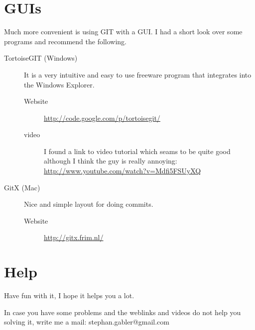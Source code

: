 \documentclass[]{article}
\begin{document}
\section{GUIs} %
\label{sg:sec:guis}

Much more convenient is using GIT with a GUI. I had a short look over some programs and recommend the following.

\begin{description}
	\item[TortoiseGIT (Windows)] 
	It is a very intuitive and easy to use freeware program that integrates into the Windows Explorer.
	\begin{description}
		\item[Website] \url{http://code.google.com/p/tortoisegit/}
		\item[video] I found a link to video tutorial which seams to be quite good although I think the guy is really annoying: \url{http://www.youtube.com/watch?v=Mdfi5FSUyXQ} 
	\end{description} 
	
	\item[GitX (Mac)] Nice and simple layout for doing commits.
	\begin{description}
		\item[Website] \url{http://gitx.frim.nl/}
	\end{description}
\end{description}




\section{Help} %
\label{sg:sec:help}

Have fun with it, I hope it helps you a lot. 

In case you have some problems and the weblinks and videos do not help
you solving it, write me a mail: stephan.gabler@gmail.com


\end{document}

